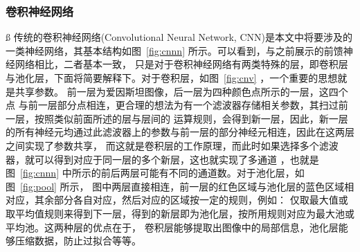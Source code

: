 \documentclass[aps,pre,12pt,preprint,onecolumn,showpacs,showkeys]{revtex4-1}
\begin{document}
\subsubsection{卷积神经网络}ß
传统的卷积神经网络(Convolutional Neural 
Network, CNN)是本文中将要涉及的一类神经网络，其基本结构如图~\ref{fig:cnnn} 所示。可以看到，与之前展示的前馈神经网络相比，二者基本一致，
只是对于卷积神经网络有两类特殊的层，即卷积层与池化层，下面将简要解释下。对于卷积层，如图~\ref{fig:cnv} ，一个重要的思想就是共享参数。
前一层为爱因斯坦图像，后一层为四种颜色点所示的一层，这四个点
与前一层部分点相连，更合理的想法为有一个滤波器存储相关参数，其扫过前一层，按照类似前面所述的层与层间的
运算规则，会得到新一层，因此，新一层的所有神经元均通过此滤波器上的参数与前一层的部分神经元相连，因此在这两层之间实现了参数共享，
而这就是卷积层的工作原理，而此时如果选择多个滤波器，就可以得到对应于同一层的多个新层，这也就实现了多通道
，也就是图~\ref{fig:cnnn} 中所示的前后两层可能有不同的通道数。对于池化层，如图~\ref{fig:pool} 所示，
图中两层直接相连，前一层的红色区域与池化层的蓝色区域相对应，其余部分各自对应，然后对应的区域按一定的规则，例如：
仅取最大值或取平均值规则来得到下一层，得到的新层即为池化层，按所用规则对应为最大池或平均池。这两种层的优点在于，
卷积层能够提取出图像中的局部信息，池化层能够压缩数据，防止过拟合等等。
\end{document}
